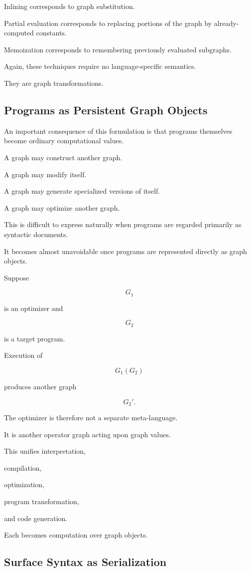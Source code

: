 \documentclass[12pt,oneside]{article}
\begin{document}
Inlining corresponds to graph substitution.

Partial evaluation corresponds to replacing portions of the graph by already-computed constants.

Memoization corresponds to remembering previously evaluated subgraphs.

Again, these techniques require no language-specific semantics.

They are graph transformations.

\subsection{Programs as Persistent Graph Objects}

An important consequence of this formulation is that programs themselves become ordinary computational values.

A graph may construct another graph.

A graph may modify itself.

A graph may generate specialized versions of itself.

A graph may optimize another graph.

This is difficult to express naturally when programs are regarded primarily as syntactic documents.

It becomes almost unavoidable once programs are represented directly as graph objects.

Suppose

\[
G_1
\]

is an optimizer and

\[
G_2
\]

is a target program.

Execution of

\[
G_1(G_2)
\]

produces another graph

\[
G_2'.
\]

The optimizer is therefore not a separate meta-language.

It is another operator graph acting upon graph values.

This unifies interpretation,

compilation,

optimization,

program transformation,

and code generation.

Each becomes computation over graph objects.

\subsection{Surface Syntax as Serialization}
\end{document}
